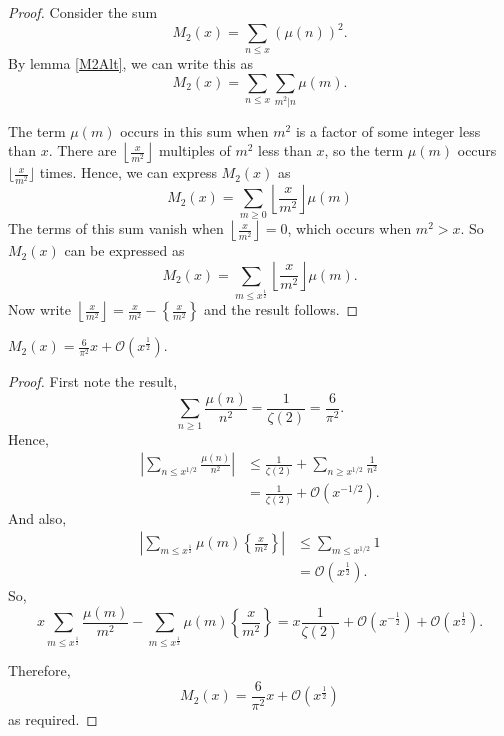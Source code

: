 \documentclass{unswmaths}
\begin{document}
\begin{proof}
    Consider the sum
    \begin{equation*}
        M_2(x) = \sum_{n\leq x} (\mu(n))^2.
    \end{equation*}
    By lemma \ref{M2Alt}, we can write this as
    \begin{equation*}
        M_2(x) = \sum_{n\leq x}\sum_{m^2|n}\mu(m).
    \end{equation*}
    
    The term $\mu(m)$ occurs in this sum when $m^2$ is a factor of some integer
    less than $x$. There are $\left\lfloor \frac{x}{m^2}\right\rfloor$ multiples of $m^2$
    less than $x$, so the term $\mu(m)$ occurs $\lfloor \frac{x}{m^2}\rfloor$
    times. Hence, we can express $M_2(x)$ as
    \begin{equation*}
        M_2(x) = \sum_{m\geq0} \left\lfloor\frac{x}{m^2}\right\rfloor\mu(m)
    \end{equation*}
    The terms of this sum vanish when $\left\lfloor \frac{x}{m^2}\right\rfloor = 0$,
    which occurs when $m^2 > x$. So $M_2(x)$ can be expressed as
    \begin{equation*}
        M_2(x) = \sum_{m\leq x^\frac{1}{2}}\left\lfloor\frac{x}{m^2}\right\rfloor\mu(m).
    \end{equation*}
    Now write $\left\lfloor\frac{x}{m^2}\right\rfloor = \frac{x}{m^2}-\left\{\frac{x}{m^2}\right\}$
    and the result follows.
\end{proof}
\begin{theorem}
    $M_2(x) = \frac{6}{\pi^2}x+\mathcal{O}(x^\frac{1}{2})$.
\end{theorem}
\begin{proof}
    First note the result,
    \begin{equation*}
        \sum_{n\geq 1} \frac{\mu(n)}{n^2} = \frac{1}{\zeta(2)} = \frac{6}{\pi^2}.
    \end{equation*}
    Hence,
    \begin{align*}
        |\sum_{n\leq x^{1/2}} \frac{\mu(n)}{n^2}| &\leq \frac{1}{\zeta(2)}+\sum_{n\geq x^{1/2}} \frac{1}{n^2}\\
        &= \frac{1}{\zeta(2)}+\mathcal{O}(x^{-1/2}).
    \end{align*}
    And also,
    \begin{align*}
        |\sum_{m\leq x^\frac{1}{2}}\mu(m)\left\{\frac{x}{m^2}\right\}| &\leq \sum_{m\leq x^{1/2}} 1\\
        &= \mathcal{O}(x^\frac{1}{2}).
    \end{align*}
    So,
    \begin{equation*}
        x\sum_{m\leq x^\frac{1}{2}} \frac{\mu(m)}{m^2}-\sum_{m\leq x^\frac{1}{2}}\mu(m)\left\{\frac{x}{m^2}\right\} = x\frac{1}{\zeta(2)}+\mathcal{O}(x^{-\frac{1}{2}})+\mathcal{O}(x^\frac{1}{2}).
    \end{equation*}
    
    Therefore,
    \begin{equation*}
        M_2(x) = \frac{6}{\pi^2}x+\mathcal{O}(x^\frac{1}{2})
    \end{equation*}
    as required.
    
    
\end{proof}
\end{document}
